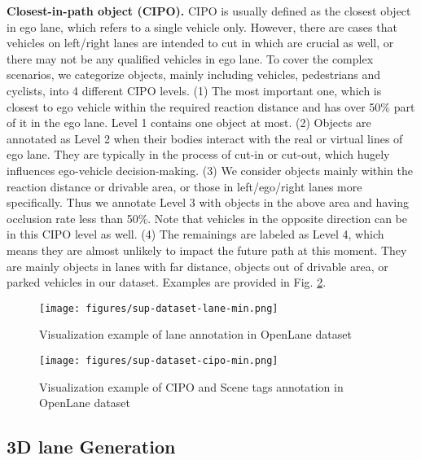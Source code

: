 \documentclass[runningheads]{llncs}
\begin{document}
\textbf{Closest-in-path object (CIPO).}
CIPO is usually defined as the closest object in ego lane, which refers to a single vehicle only.
However, there are cases that vehicles on left/right lanes are intended to cut in which are crucial as well, or there may not be any qualified vehicles in ego lane.
To cover the complex scenarios, we categorize objects, mainly including vehicles, pedestrians and cyclists, into 4 different CIPO levels.
(1) The most important one, which is closest to ego vehicle within the required reaction distance and has over 50\% part of it in the ego lane. Level 1 contains one object at most.
(2) Objects are annotated as Level 2 when their bodies interact with the real or virtual lines of ego lane. They are typically in the process of cut-in or cut-out, which hugely influences ego-vehicle decision-making.
(3) We consider objects mainly within the reaction distance or drivable area, or those in left/ego/right lanes more specifically. Thus we annotate Level 3 with objects in the above area and having occlusion rate less than 50\%.
Note that vehicles in the opposite direction can be in this CIPO level as well.
(4) The remainings are labeled as Level 4, which means they are almost unlikely to impact the future path at this moment. They are mainly objects in lanes with far distance, objects out of drivable area, or parked vehicles in our dataset.
Examples are provided in Fig. \ref{fig:sup-dataset example-cipo}.










\begin{figure}[t!]
    \centering
    \texttt{[image: figures/sup-dataset-lane-min.png]}
    \caption{Visualization example of lane annotation in OpenLane dataset}
    \label{fig:sup-dataset example-lane}
\end{figure}
\begin{figure}[t!]
    \centering
    \texttt{[image: figures/sup-dataset-cipo-min.png]}
    \caption{Visualization example of CIPO and Scene tags annotation in OpenLane dataset}
    \label{fig:sup-dataset example-cipo}
    \vspace{-4pt}
\end{figure}


\subsection{3D lane Generation}
\end{document}

